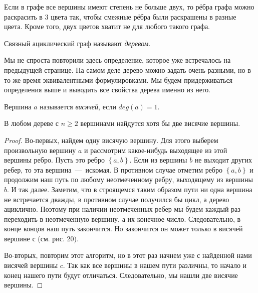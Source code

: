 \begin{consequence}
	Если в графе все вершины имеют степень не больше двух, то рёбра графа можно раскрасить в $3$ цвета так, чтобы смежные рёбра были раскрашены в разные цвета. Кроме того, двух цветов хватит не для любого такого графа.
\end{consequence}


\begin{definition}
	Связный ациклический граф называют \emph{деревом}.
\end{definition}

	Мы не спроста повторили здесь определение, которое уже встречалось на предыдущей странице. На самом деле дерево можно задать очень разными, но в то же время эквивалентными формулировками. Мы будем придерживаться определения выше и выводить все свойства дерева именно из него.

\begin{definition}
	Вершина $a$ называется \emph{висячей}, если $deg(a) = 1$.
\end{definition}

\begin{lemma*}
	В любом дереве с $n \geqslant 2$ вершинами найдутся хотя бы две висячие вершины.
	
\begin{proof}	
	 Во-первых, найдем одну висячую вершину. Для этого выберем произвольную вершину $a$ и рассмотрим какое-нибудь выходящее из этой вершины ребро. Пусть это ребро $\left\lbrace a, b \right\rbrace$. Если из вершины $b$ не выходит других ребер, то эта вершина~---~искомая. В противном случае отметим ребро $\left\lbrace a, b \right\rbrace$ и продолжим наш путь по любому неотмеченному ребру, выходящему из вершины $b$. И так далее. Заметим, что в строящемся таким образом пути ни одна вершина не встречается дважды, в противном случае получился бы цикл, а дерево ациклично. Поэтому при наличии неотмеченных ребер мы будем каждый раз переходить в неотмеченную вершину, а их конечное число. Следовательно, в конце концов наш путь закончится. Но закончится он может только в висячей вершине $с$ (см. рис. 20). 
	
	Во-вторых, повторим этот алгоритм, но в этот раз начнем уже с найденной нами висячей вершины $c$. Так как все вершины в нашем пути различны, то начало и конец нашего пути будут отличаться. Следовательно, мы нашли две висячие вершины.
\end{proof}
\end{lemma*}

